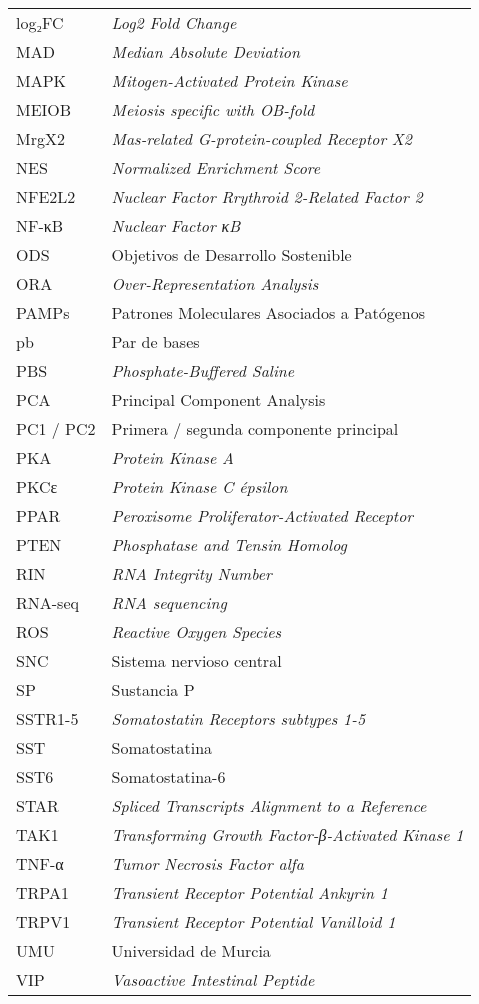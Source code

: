 \documentclass[10pt,a4paper]{article}
\begin{document}
\begin{tabular}{@{}ll@{}}
log₂FC & \textit{Log2 Fold Change} \\
MAD & \textit{Median Absolute Deviation} \\
MAPK	 & \textit{Mitogen-Activated Protein Kinase} \\
MEIOB &  \textit{Meiosis specific with OB-fold} \\
MrgX2 & \textit{Mas-related G-protein-coupled Receptor X2} \\
NES	 & \textit{Normalized Enrichment Score} \\
NFE2L2 & \textit{Nuclear Factor Rrythroid 2-Related Factor 2} \\
NF-κB & \textit{Nuclear Factor κB} \\
ODS & Objetivos de Desarrollo Sostenible \\
ORA & \textit{Over-Representation Analysis} \\
PAMPs & Patrones Moleculares Asociados a Patógenos \\
pb & Par de bases \\
PBS & \textit{Phosphate-Buffered Saline}  \\
PCA & Principal Component Analysis \\
PC1 / PC2 & Primera / segunda componente principal \\
PKA & \textit{Protein Kinase A} \\
PKCε & \textit{Protein Kinase C épsilon} \\
PPAR & \textit{Peroxisome Proliferator-Activated Receptor} \\
PTEN & \textit{Phosphatase and Tensin Homolog} \\
RIN & \textit{RNA Integrity Number} \\
RNA-seq & \textit{RNA sequencing} \\
ROS & \textit{Reactive Oxygen Species} \\
SNC	 & Sistema nervioso central \\
SP & Sustancia P \\
SSTR1-5 & \textit{Somatostatin Receptors subtypes 1-5} \\
SST & Somatostatina \\
SST6 & Somatostatina-6 \\
STAR & \textit{Spliced Transcripts Alignment to a Reference} \\
TAK1 & \textit{Transforming Growth Factor-β-Activated Kinase 1} \\
TNF-α & \textit{Tumor Necrosis Factor alfa} \\
TRPA1 & \textit{Transient Receptor Potential Ankyrin 1} \\
TRPV1 & \textit{Transient Receptor Potential Vanilloid 1} \\
UMU & Universidad de Murcia \\
VIP & \textit{Vasoactive Intestinal Peptide} \\
\end{tabular}
\setlength{\tabcolsep}{6pt}   %
\end{document}
